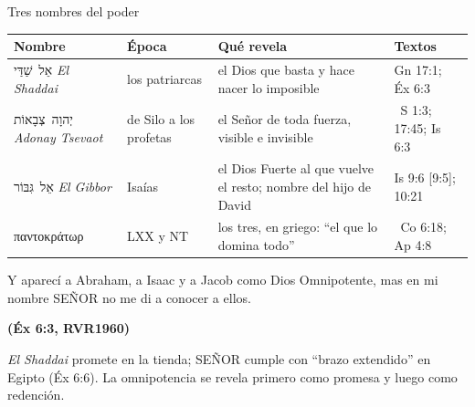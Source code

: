 \documentclass[hyperref={bookmarks=false},aspectratio=169]{beamer}
\newcommand{\heb}[1]{\mbox{\foreignlanguage{hebrew}{#1}}}
\newcommand{\grc}[1]{\foreignlanguage{ancientgreek}{#1}}
\newcommand{\SENOR}{S{\fontsize{0.78em}{1em}\selectfont EÑOR}}
\newcommand{\fuente}[1]{\par\hfill{\upshape\bfseries\footnotesize\textcolor{azul}{#1}}}
\begin{document}
\begin{frame}{Tres nombres del poder}
\scriptsize\renewcommand{\arraystretch}{1.2}
\begin{tabular}{@{}>{\RaggedRight\arraybackslash}p{2.6cm}>{\RaggedRight\arraybackslash}p{2.3cm}>{\RaggedRight\arraybackslash}p{4.4cm}>{\RaggedRight\arraybackslash}p{2.6cm}@{}}
\toprule
\textbf{Nombre} & \textbf{Época} & \textbf{Qué revela} & \textbf{Textos} \\ \midrule
\heb{אֵל שַׁדַּי} \emph{El Shaddai} & los patriarcas & el Dios que basta y hace nacer lo imposible & Gn 17:1; Éx 6:3 \\
\heb{יְהוָה צְבָאוֹת} \emph{Adonay Tsevaot} & de Silo a los profetas & el Señor de toda fuerza, visible e invisible & 1~S 1:3; 17:45; Is 6:3 \\
\heb{אֵל גִּבּוֹר} \emph{El Gibbor} & Isaías & el Dios Fuerte al que vuelve el resto; nombre del hijo de David & Is 9:6 [9:5]; 10:21 \\
\grc{παντοκράτωρ} & LXX y NT & los tres, en griego: ``el que lo domina todo'' & 2~Co 6:18; Ap 4:8 \\
\bottomrule
\end{tabular}\par\medskip
\begin{cita}Y aparecí a Abraham, a Isaac y a Jacob como Dios Omnipotente, mas en mi nombre \SENOR{} no me di a conocer a ellos.\fuente{(Éx 6:3, RVR1960)}\end{cita}
\small \emph{El Shaddai} promete en la tienda; \SENOR{} cumple con ``brazo extendido'' en Egipto (Éx 6:6). La omnipotencia se revela primero como promesa y luego como redención.
\end{frame}
\end{document}
